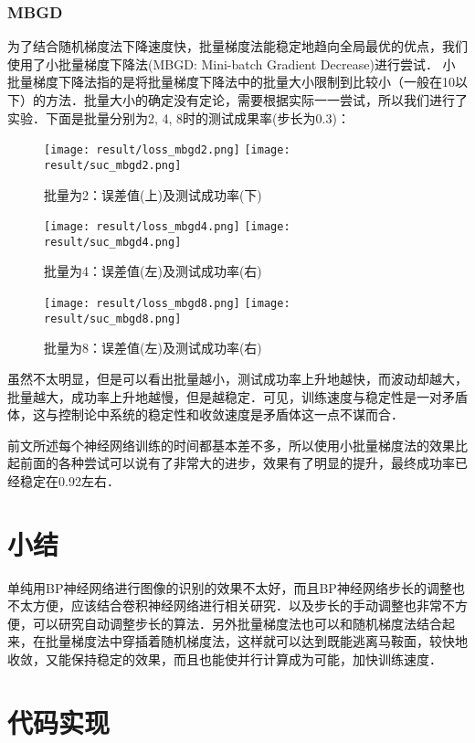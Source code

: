 \documentclass{article}
\begin{document}
  \subsubsection{MBGD}
    为了结合随机梯度法下降速度快，批量梯度法能稳定地趋向全局最优的优点，我们使用了小批量梯度下降法(MBGD: Mini-batch Gradient Decrease)进行尝试．
    小批量梯度下降法指的是将批量梯度下降法中的批量大小限制到比较小（一般在10以下）的方法．批量大小的确定没有定论，需要根据实际一一尝试，所以我们进行了实验．下面是批量分别为2, 4, 8时的测试成果率(步长为0.3)：
  \begin{figure}
    \centering
    \texttt{[image: result/loss\_mbgd2.png]}
    \texttt{[image: result/suc\_mbgd2.png]}
    \caption{批量为2：误差值(上)及测试成功率(下)}
  \end{figure}
  \begin{figure}
    \centering
    \texttt{[image: result/loss\_mbgd4.png]}
    \texttt{[image: result/suc\_mbgd4.png]}
    \caption{批量为4：误差值(左)及测试成功率(右)}
  \end{figure}
  \begin{figure}
    \centering
    \texttt{[image: result/loss\_mbgd8.png]}
    \texttt{[image: result/suc\_mbgd8.png]}
    \caption{批量为8：误差值(左)及测试成功率(右)}
  \end{figure}
  \restoregeometry
    虽然不太明显，但是可以看出批量越小，测试成功率上升地越快，而波动却越大，批量越大，成功率上升地越慢，但是越稳定．可见，训练速度与稳定性是一对矛盾体，这与控制论中系统的稳定性和收敛速度是矛盾体这一点不谋而合．

    前文所述每个神经网络训练的时间都基本差不多，所以使用小批量梯度法的效果比起前面的各种尝试可以说有了非常大的进步，效果有了明显的提升，最终成功率已经稳定在0.92左右．

  \section{小结}
  单纯用BP神经网络进行图像的识别的效果不太好，而且BP神经网络步长的调整也不太方便，应该结合卷积神经网络进行相关研究．以及步长的手动调整也非常不方便，可以研究自动调整步长的算法．另外批量梯度法也可以和随机梯度法结合起来，在批量梯度法中穿插着随机梯度法，这样就可以达到既能逃离马鞍面，较快地收敛，又能保持稳定的效果，而且也能使并行计算成为可能，加快训练速度．

  \section{代码实现}
\end{document}

